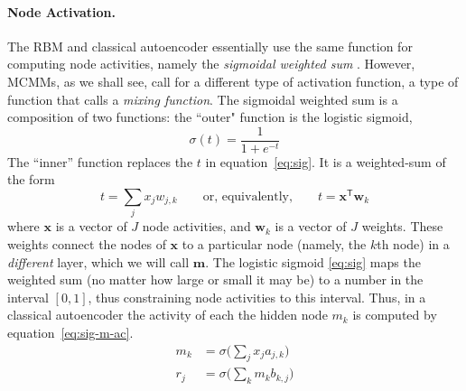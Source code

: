 \paragraph{Node Activation.} The RBM and classical autoencoder essentially use the same function for computing node activities, namely the \emph{sigmoidal weighted sum} \citep{hinton:1987trans, hinton-and-salak:2006}.
However, MCMMs, as we shall see, call for a different type of activation function, a type of function that \citet{saund:94} calls a \emph{mixing function}.
The sigmoidal weighted sum is a composition of two functions: the ``outer" function is the logistic sigmoid, 
	\begin{equation} %
	\label{eq:sig}
	\sigma(t) = \frac{1}{1 + e^{-t}} 
	\end{equation} %
The ``inner'' function replaces the $t$ in equation~\eqref{eq:sig}. It is a weighted-sum of the form 
\begin{equation} \label{eq:wtd-sum}
t = \sum_{j} x_{j} w_{j,k} \qquad  \text{or, equivalently,} \qquad t = \textbf{x}^{\textsf{T}}\textbf{w}_k
\end{equation}
where $\textbf{x}$ is a vector of $J$ node activities, and $\textbf{w}_k$ is a vector of $J$ weights. These weights connect the nodes of $\textbf{x}$ to a particular node (namely, the $k$th node) in a \emph{different} layer, which we will call $\textbf{m}$. 
The logistic sigmoid \eqref{eq:sig} maps the weighted sum (no matter how large or small it may be) to a number in the interval $[0,1]$, thus constraining node activities to this interval.
Thus, in a classical autoencoder the activity of each the hidden node $m_k$ is computed by equation~\eqref{eq:sig-m-ac}. 
\begin{align}
\label{eq:sig-m-ac}
m_{k} &= \sigma\big(\sum_{j} x_{j} a_{j,k}\big) \\
\label{eq:sig-r-ac}
r_{j} &= \sigma\big(\sum_{k}  m_{k} b_{k,j} \big)
\end{align}
